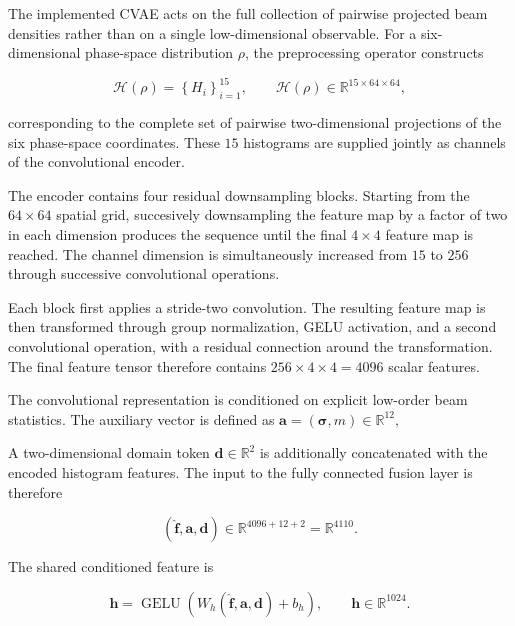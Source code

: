 The implemented CVAE acts on the full collection of pairwise projected beam densities rather than on a single low-dimensional observable. For a six-dimensional phase-space distribution $\rho$, the preprocessing operator constructs

\[
    \mathcal{H}(\rho)
    =
    \left\{
        H_i
    \right\}_{i=1}^{15},
    \qquad
    \mathcal{H}(\rho)
    \in
    \mathbb{R}^{15\times64\times64},
\]

corresponding to the complete set of pairwise two-dimensional projections of the six phase-space coordinates. These $15$ histograms are supplied jointly as channels of the convolutional encoder.

The encoder contains four residual downsampling blocks. Starting from
the $64\times64$ spatial grid, succesively downsampling the feature map by a factor of two in each dimension produces the sequence until the final $4\times4$ feature map is reached. The channel dimension is simultaneously increased from $15$ to $256$ through successive convolutional operations.

Each block first applies a stride-two convolution. The resulting feature map is then transformed through group normalization, GELU activation, and a second convolutional operation, with a residual connection around the transformation. The final feature tensor therefore contains $ 256\times4\times4=4096$ scalar features.

The convolutional representation is conditioned on explicit low-order
beam statistics. The auxiliary vector is defined as \(
    \mathbf{a}
    =
    \left(
        \boldsymbol{\sigma},
        m
    \right)
    \in
    \mathbb{R}^{12},
\)

A two-dimensional domain token \(
    \mathbf{d}
    \in
    \mathbb{R}^{2}
\) is additionally concatenated with the encoded histogram features. The input to the fully connected fusion layer is therefore

\[
    \left(
        \hat{\mathbf{f}},
        \mathbf{a},
        \mathbf{d}
    \right)
    \in
    \mathbb{R}^{4096+12+2}
    =
    \mathbb{R}^{4110}.
\]

The shared conditioned feature is

\begin{equation}
    \mathbf{h}
    =
    \operatorname{GELU}
    \left(
        W_h
        \left(
            \hat{\mathbf{f}},
            \mathbf{a},
            \mathbf{d}
        \right)
        +
        b_h
    \right),
    \qquad
    \mathbf{h}
    \in
    \mathbb{R}^{1024}.
\end{equation}
 

